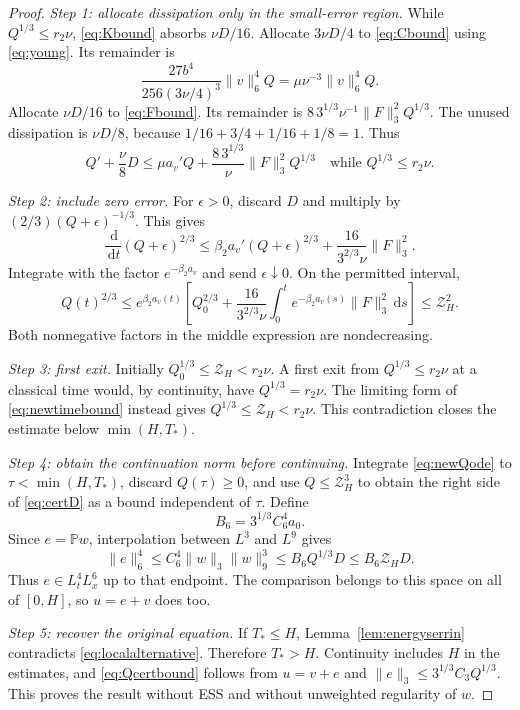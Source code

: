 \documentclass[11pt,a4paper]{article}
\theoremstyle{definition}\newtheorem{definition}[theorem]{Definition}
\theoremstyle{remark}\newtheorem{remark}[theorem]{Remark}
\newcommand{\PP}{\mathbb P}
\newcommand{\dd}{\,\mathrm d}
\newcommand{\norm}[1]{\lVert #1\rVert}
\newcommand{\Zcert}{\mathscr Z}
\numberwithin{equation}{section}
\begin{document}
\begin{proof}
\emph{Step 1: allocate dissipation only in the small-error region.}
While $Q^{1/3}\le r_2\nu$, \eqref{eq:Kbound} absorbs $\nu D/16$. Allocate $3\nu D/4$ to \eqref{eq:Cbound} using \eqref{eq:young}. Its remainder is
\[
 \frac{27b^4}{256(3\nu/4)^3}\norm v_6^4Q
 =\mu\nu^{-3}\norm v_6^4Q.
\]
Allocate $\nu D/16$ to \eqref{eq:Fbound}. Its remainder is
$8\,3^{1/3}\nu^{-1}\norm F_3^2Q^{1/3}$. The unused dissipation is $\nu D/8$, because
$1/16+3/4+1/16+1/8=1$. Thus
\begin{equation}\label{eq:newQode}
 Q'+\frac\nu8D\le\mu a_v'Q+\frac{8\,3^{1/3}}\nu\norm F_3^2Q^{1/3}
 \quad\text{while }Q^{1/3}\le r_2\nu.
\end{equation}

\emph{Step 2: include zero error.}
For $\epsilon>0$, discard $D$ and multiply by $(2/3)(Q+\epsilon)^{-1/3}$. This gives
\[
 \frac{\dd}{\dd t}(Q+\epsilon)^{2/3}
 \le\beta_2a_v'(Q+\epsilon)^{2/3}
    +\frac{16}{3^{2/3}\nu}\norm F_3^2.
\]
Integrate with the factor $e^{-\beta_2a_v}$ and send $\epsilon\downarrow0$. On the permitted interval,
\begin{equation}\label{eq:newtimebound}
 Q(t)^{2/3}\le e^{\beta_2a_v(t)}\left[Q_0^{2/3}
 +\frac{16}{3^{2/3}\nu}\int_0^t e^{-\beta_2a_v(s)}\norm F_3^2\dd s\right]
 \le\Zcert_H^2.
\end{equation}
Both nonnegative factors in the middle expression are nondecreasing.

\emph{Step 3: first exit.}
Initially $Q_0^{1/3}\le\Zcert_H<r_2\nu$. A first exit from $Q^{1/3}\le r_2\nu$ at a classical time would, by continuity, have $Q^{1/3}=r_2\nu$. The limiting form of \eqref{eq:newtimebound} instead gives $Q^{1/3}\le\Zcert_H<r_2\nu$. This contradiction closes the estimate below $\min(H,T_*)$.

\emph{Step 4: obtain the continuation norm before continuing.}
Integrate \eqref{eq:newQode} to $\tau<\min(H,T_*)$, discard $Q(\tau)\ge0$, and use $Q\le\Zcert_H^3$ to obtain the right side of \eqref{eq:certD} as a bound independent of $\tau$. Define
\begin{equation}\label{eq:B6}
 B_6=3^{1/3}C_6^4a_0.
\end{equation}
Since $e=\PP w$, interpolation between $L^3$ and $L^9$ gives
\begin{equation}\label{eq:errorSerrin}
 \norm e_6^4\le C_6^4\norm w_3\norm w_9^3
 \le B_6Q^{1/3}D\le B_6\Zcert_HD.
\end{equation}
Thus $e\in L^4_tL^6_x$ up to that endpoint. The comparison belongs to this space on all of $[0,H]$, so $u=e+v$ does too.

\emph{Step 5: recover the original equation.}
If $T_*\le H$, Lemma~\ref{lem:energyserrin} contradicts \eqref{eq:localalternative}. Therefore $T_*>H$. Continuity includes $H$ in the estimates, and \eqref{eq:Qcertbound} follows from $u=v+e$ and $\norm e_3\le3^{1/3}C_3Q^{1/3}$. This proves the result without ESS and without unweighted regularity of $w$.
\end{proof}
\end{document}
